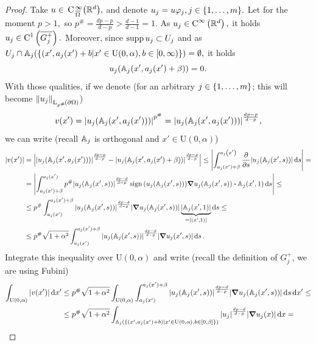 \documentclass{article}
\begin{document}
\begin{proof}
	Take $u \in \, \text{C} \,^{\infty}_{\overline{\Omega}}\qty({\mathbb R}^{d}),$ and denote $u_j = u \varphi_j, j \in \qty{1, \dots, m}.$ Let for the moment $p>1,$ so $p^{\#} = \frac{dp-p}{d-p} > \frac{d-1}{d-1} = 1.$ As $u_j \in \text{C}^{\infty}\!\,\left({\mathbb R}^{d} \right),$ it holds $u_j \in \text{C}^{1}\!\,\left(\overline{G_j^+} \right).$ Moreover, since $\operatorname{supp} u_j \subset U_j$ and as $U_j \cap \mathbb{A}_j\qty(\qty{(x', a_j(x') + b| x' \in \text{U}(0,\alpha), b \in [0, \infty)}) = \emptyset,$ it holds
	\[
		u_j\qty(\mathbb{A}_j\qty(x', a_j(x')+\beta)) = 0.
	\]
	With those qualities, if we denote (for an arbitrary $j \in \qty{1, \dots, m}$; this will become $\norm{u_j}_{\LpSet[p^{\#}]{\partial \Omega}}$)
	\[
		v\qty(x') = \abs{u_j\qty(\mathbb{A}_j\qty(x', a_j(x')))}^{p^{\#}} = \abs{u_j\qty(\mathbb{A}_j\qty(x',a_j(x')))}^{\frac{dp-p}{d-p}},
	\]
	we can write (recall $\mathbb{A}_j$ is orthogonal and $x' \in \text{U}(0,\alpha)$)
	\begin{align*}
		\abs{v(x')} &= \abs{\abs{u_j\qty(\tensorq{A}_j\qty(x',a_j\qty(x')))}^{\frac{dp-p}{d-p}} - \abs{u_j\qty(\tensorq{A}_j\qty(x',a_j\qty(x')+\beta))}^{\frac{dp-p}{d-p}}} \leq \abs{\int^{a_j\qty(x')}_{a_j\qty(x')+\beta} \pdv{s} \abs{u_j\qty(\tensorq{A}_j\qty(x',s))} \dd{s}} = \\
			    &= \abs{\int_{a_j(x')+\beta}^{a_j(x')}p^{\#}\abs{u_j\qty(\tensorq{A}_j\qty(x',s))}^{\frac{dp-d}{d-p}}\signum\qty(u_j\qty(\tensorq{A}_j\qty(x',s)))\grad u_j\qty(\tensorq{A}_j\qty(x',s))\vdot \tensorq{A}_j\qty(x',1)\dd{s}} \leq \\
			    &\leq p^{\#}\int^{a_j(x')+\beta}_{a_j(x')}\abs{u_j\qty(\tensorq{A}_j\qty(x',s))}^{\frac{dp-d}{d-p}}\abs{\grad u_j\qty(\tensorq{A}_j\qty(x',s))}\underbrace{\abs{\tensorq{A}_j\qty(x',1)}}_{=\abs{\qty(x',1)}}\dd{s} \leq \\
			    &\leq p^{\#}\sqrt{1+\alpha^{2}}\int_{a_j(x')}^{a_j(x')+\beta}\abs{u_j\qty(\tensorq{A}_j\qty(x',s))}^{\frac{dp-d}{d-p}}\abs{\grad u_j\qty(x',s)}\dd{s}.
	\end{align*}
	Integrate this inequality over $\text{U}(0,\alpha)$ and write (recall the definition of $G_j^{+}$, we are using Fubini)
	\begin{align*}
		\int_{\text{U}(0,\alpha)}\abs{v\qty(x')}\dd{x'} &\leq p^{\#}\sqrt{1+\alpha^{2}} \int_{\text{U}(0,\alpha)}\int_{a_j(x')}^{a_j(x')+\beta}\abs{u_j\qty(\tensorq{A}_j\qty(x',s))}^{\frac{dp-d}{d-p}}\abs{\grad u_j\qty(\tensorq{A}_j\qty(x',s))}\dd{s}\dd{x'} \leq \\
								&\leq p^{\#}\sqrt{1+\alpha^{2}}\int_{\tensorq{A}_j\qty(\qty{(x', a_j(x')+b)|x' \in \text{U}(0,\alpha), b \in [0,\beta]})}\abs{u_j}^{\frac{dp-d}{d-p}}\abs{\grad u_j(x)}\dd{x} = \\

\end{align*}
\end{proof}
\end{document}
